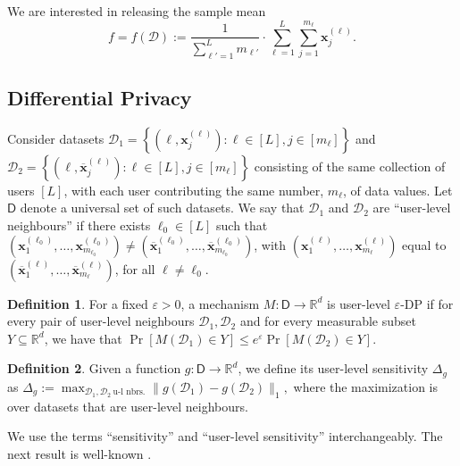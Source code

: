 \documentclass[conference,letterpaper]{IEEEtran}
\theoremstyle{remark}
\theoremstyle{definition}
\newtheorem{definition}{Definition}[section]
\begin{document}
We are interested in releasing the sample mean
\[
	\label{eq:f}
f = f(\mathcal{D}):= \frac{1}{\sum_{\ell'=1}^L m_{\ell'}}\cdot \sum_{\ell=1}^L \sum_{j=1}^{m_\ell} \mathbf{x}_j^{(\ell)}.
\]




\subsection{Differential Privacy}
\label{sec:dp}
Consider datasets $\mathcal{D}_1 = \left\{\left({\ell},\mathbf{x}_j^{(\ell)}\right): \ell \in [L], j\in [m_\ell]\right\}$ and $\mathcal{D}_2 = \left\{\left(\ell,\overline{\mathbf{x}}_j^{(\ell)}\right): \ell \in [L], j\in [m_\ell]\right\}$ consisting of the same collection of users $[L]$, with each user contributing the same number, $m_\ell$, of  data values. Let $\mathsf{D}$ denote a universal set of such datasets. We say that $\mathcal{D}_1$ and $\mathcal{D}_2$ are ``user-level neighbours'' if there exists $\ell_0\in [L]$ such that $\left(\mathbf{x}^{(\ell_0)}_{1},\ldots, \mathbf{x}^{(\ell_0)}_{m_{\ell_0}}\right)\neq \left(\overline{\mathbf{x}}^{(\ell_0)}_{1},\ldots, \overline{\mathbf{x}}^{(\ell_0)}_{m_{\ell_0}}\right)$, with $\left(\mathbf{x}^{(\ell)}_{1},\ldots, \mathbf{x}^{(\ell)}_{m_{\ell}}\right)$ equal to $ \left(\overline{\mathbf{x}}^{(\ell)}_{1},\ldots, \overline{\mathbf{x}}^{(\ell)}_{m_{\ell}}\right)$, for all $\ell\neq \ell_0$. 

\begin{definition}
	For a fixed $\varepsilon>0$, a mechanism $M: \mathsf{D}\to \mathbb{R}^d$ is  user-level $\varepsilon$-DP if for every pair of user-level neighbours $\mathcal{D}_1, \mathcal{D}_2$ and for every measurable subset $Y \subseteq \mathbb{R}^d$, we have that
	$
	\Pr[M(\mathcal{D}_1) \in Y] \leq e^\varepsilon \Pr[M(\mathcal{D}_2) \in Y].
	$
\end{definition}
\begin{definition}
	Given a function $g: \mathsf{D}\to \mathbb{R}^d$, we define its user-level sensitivity $\Delta_g$ as
	$
	\Delta_g:= \max_{\mathcal{D}_1,\mathcal{D}_2\ \text{u-l nbrs.}} \lVert g(\mathcal{D}_1) - g(\mathcal{D}_2)\rVert_1,
	$
	where the maximization is over datasets that are user-level neighbours.
\end{definition}
We use the terms ``sensitivity'' and ``user-level sensitivity'' interchangeably. The next result is well-known \cite[Prop. 1]{dwork06}.
\end{document}
